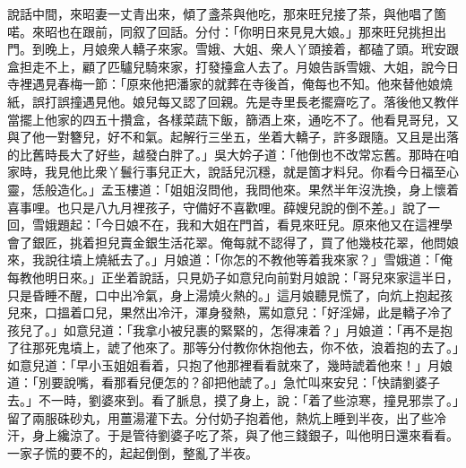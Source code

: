 說話中間，來昭妻一丈青出來，傾了盞茶與他吃，那來旺兒接了茶，與他唱了箇喏。來昭也在跟前，同叙了回話。分付：「你明日來見見大娘。」那來旺兒挑担出門。到晚上，月娘衆人轎子來家。雪娥、大姐、衆人丫頭接着，都磕了頭。玳安跟盒担走不上，顧了匹驢兒騎來家，打發擡盒人去了。月娘告訴雪娥、大姐，說今日寺裡遇見春梅一節：「原來他把潘家的就葬在寺後首，俺每也不知。他來替他娘燒紙，誤打誤撞遇見他。娘兒每又認了回親。先是寺里長老擺齋吃了。落後他又教伴當擺上他家的四五十攢盒，各樣菜蔬下飯，篩酒上來，通吃不了。他看見哥兒，又與了他一對簪兒，好不和氣。起解行三坐五，坐着大轎子，許多跟隨。又且是出落的比舊時長大了好些，越發白胖了。」{}吳大妗子道：「他倒也不改常忘舊。那時在咱家時，我見他比衆丫鬟行事兒正大，說話兒沉穩，就是箇才料兒。你看今日福至心靈，恁般造化。」{}孟玉樓道：「姐姐沒問他，我問他來。果然半年沒洗換，身上懷着喜事哩。也只是八九月裡孩子，守備好不喜歡哩。薛嫂兒說的倒不差。」說了一回，雪娥題起：「今日娘不在，我和大姐在門首，看見來旺兒。原來他又在這裡學會了銀匠，挑着担兒賣金銀生活花翠。俺每就不認得了，買了他幾枝花翠，他問娘來，我說往墳上燒紙去了。」月娘道：「你怎的不教他等着我來家？」雪娥道：「俺每教他明日來。」正坐着說話，只見奶子如意兒向前對月娘說：「哥兒來家這半日，只是昏睡不醒，口中出冷氣，身上湯燒火熱的。」這月娘聽見慌了，向炕上抱起孩兒來，口搵着口兒，果然出冷汗，渾身發熱，罵如意兒：「好淫婦，此是轎子冷了孩兒了。」如意兒道：「我拿小被兒裹的緊緊的，怎得凍着？」月娘道：「再不是抱了往那死鬼墳上，諕了他來了。那等分付教你休抱他去，你不依，浪着抱的去了。」如意兒道：「早小玉姐姐看着，只抱了他那裡看看就來了，幾時諕着他來！」月娘道：「別要說嘴，看那看兒便怎的？卻把他諕了。」急忙叫來安兒：「快請劉婆子去。」不一時，劉婆來到。看了脈息，摸了身上，說：「着了些涼寒，撞見邪祟了。」{}留了兩服硃砂丸，用薑湯灌下去。分付奶子抱着他，熱炕上睡到半夜，出了些冷汗，身上纔涼了。于是管待劉婆子吃了茶，與了他三錢銀子，叫他明日還來看看。一家子慌的要不的，起起倒倒，整亂了半夜。

